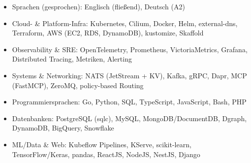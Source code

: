 \documentclass[10pt,a4paper]{resume}
\begin{document}
\begin{itemize}[leftmargin=1.4em,nosep,topsep=2pt]
  \item Sprachen (gesprochen): Englisch (fließend), Deutsch (A2)
  \item Cloud- \& Platform-Infra: Kubernetes, Cilium, Docker, Helm, external-dns, Terraform, AWS (EC2, RDS, DynamoDB), kustomize, Skaffold
  \item Observability \& SRE: OpenTelemetry, Prometheus, VictoriaMetrics, Grafana, Distributed Tracing, Metriken, Alerting
  \item Systems \& Networking: NATS (JetStream + KV), Kafka, gRPC, Dapr, MCP (FastMCP), ZeroMQ, policy-based Routing
  \item Programmiersprachen: Go, Python, SQL, TypeScript, JavaScript, Bash, PHP
  \item Datenbanken: PostgreSQL (sqlc), MySQL, MongoDB/DocumentDB, Dgraph, DynamoDB, BigQuery, Snowflake
  \item ML/Data \& Web: Kubeflow Pipelines, KServe, scikit-learn, TensorFlow/Keras, pandas, ReactJS, NodeJS, NestJS, Django
\end{itemize}
\end{document}

